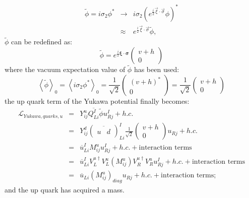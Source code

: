 \begin{eqnarray}
\tilde{\phi} = i\sigma_2\phi^* &\rightarrow& i\sigma_2\left(e^{\frac{i}{2}\vec{\xi} \cdot \vec{\sigma}} \phi \right)^* \nonumber \\
&\approx& e^{\frac{i}{2}\vec{\xi} \cdot \vec{\sigma}} \tilde{\phi},
\label{eqn:trmfphitilde}
\end{eqnarray}
$\tilde{\phi}$ can be redefined as:
\begin{equation}
\tilde{\phi} = e^{\frac{i}{2}\mathbf{\xi \cdot \sigma}}\left( \begin{array}{c} v+h \\ 0 \end{array} \right)
\label{eqn:phitildedefined}
\end{equation}
where the vacuum expectation value of $\tilde{\phi}$ has been used:
\begin{equation}
\left<\tilde{\phi}\right>_0 = \left<i\sigma_2\phi^*\right>_0 = \frac{1}{\sqrt{2}} \left( \begin{array}{c} (v + h)^* \\ 0 \end{array} \right) = \frac{1}{\sqrt{2}} \left( \begin{array}{c} v + h \\ 0 \end{array} \right)
\label{eqn:vevphitilde}
\end{equation}
the up quark term of the Yukawa potential finally becomes:
\begin{eqnarray}
\mathcal L_{Yukawa,quarks,u} &=&  Y^u_{ij}\overline{Q^I_{Li}}\tilde{\phi} u^I_{Rj} + h.c. \nonumber \\
&=& Y^d_{ij}  \left( \overline{ \begin{array}{cc} u & d \end{array} } \right)^I_{Li}  \frac{1}{\sqrt{2}}  \left( \begin{array}{c} v + h \\ 0 \end{array} \right)  u_{Rj} + h.c.\nonumber \\ 
&=& \overline{u}^I_{Li}M^u_{ij}u^I_{Rj} + h.c. + \mbox{interaction terms} \nonumber \\
&=& \overline{u}^I_{Li}V^{u\dag}_LV^u_L(M^u_{ij})V^{u\dag}_R V^u_Ru^I_{Rj} + h.c. + \mbox{interaction terms} \nonumber\\
&=& \overline{u}_{Li}(M^u_{ij})_{diag}u_{Rj} + h.c. + \mbox{interaction terms};
\label{eqn:SMLYukawaUquark}
\end{eqnarray}
and the up quark has acquired a mass.

